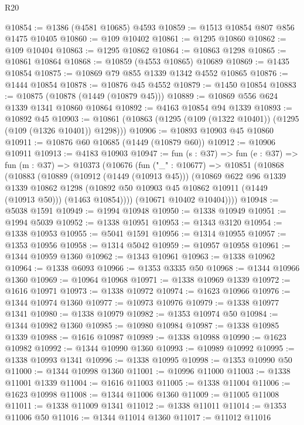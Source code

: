 \begin{lexlean}{R20}
\begin{coremodule}
@10854 := @1386 (@4581 @10685) @4593
@10859 := @1513 @10854 @807 @856 @1475 @10405
@10860 := @109 @10402
@10861 := @1295 @10860
@10862 := @109 @10404
@10863 := @1295 @10862
@10864 := @10863 @1298
@10865 := @10861 @10864
@10868 := @10859 (@4553 @10865) @10689
@10869 := @1435 @10854
@10875 := @10869 @79 @855 @1339 @1342 @4552 @10865
@10876 := @1444 @10854
@10878 := @10876 @45 @4552
@10879 := @1450 @10854
@10883 := @10875 (@10878 (@1449 (@10879 @45)))
@10889 := @10869 @556 @624 @1339 @1341 @10860 @10864
@10892 := @4163 @10854 @94 @1339
@10893 := @10892 @45
@10903 := @10861 (@10863 (@1295 (@109 (@1322 @10401)) (@1295 (@109 (@1326 @10401)) @1298)))
@10906 := @10893 @10903 @45 @10860
@10911 := @10876 @60 @10685 (@1449 (@10879 @60))
@10912 := @10906 @10911
@10913 := @4183 @10903
@10947 := fun (s : @37) =>
  fun (e : @37) =>
  fun (m : @37) =>
  @10373
    (@10676
      (fun ("_" : @10677) =>
      @10851
        (@10868
          (@10883
            (@10889
              (@10912 (@1449 (@10913 @45)))
              (@10869
                @622
                @96
                @1339
                @1339
                @10862
                @1298
                (@10892 @50 @10903 @45 @10862 @10911 (@1449 (@10913 @50)))
                (@1463 @10854))))
          (@10671 @10402 @10404))))
@10948 := @5038 @1591
@10949 := @1994 @10948
@10950 := @1338 @10949
@10951 := @1994 @5039
@10952 := @1338 @10951
@10953 := @1343 @3120
@10954 := @1338 @10953
@10955 := @5041 @1591
@10956 := @1314 @10955
@10957 := @1353 @10956
@10958 := @1314 @5042
@10959 := @10957 @10958
@10961 := @1344 @10959 @1360
@10962 := @1343 @10961
@10963 := @1338 @10962
@10964 := @1338 @6093
@10966 := @1353 @3335 @50
@10968 := @1344 @10966 @1360
@10969 := @10964 @10968
@10971 := @1338 @10969 @1339
@10972 := @1616 @10971
@10973 := @1338 @10972
@10974 := @1623 @10966
@10976 := @1344 @10974 @1360
@10977 := @10973 @10976
@10979 := @1338 @10977 @1341
@10980 := @1338 @10979
@10982 := @1353 @10974 @50
@10984 := @1344 @10982 @1360
@10985 := @10980 @10984
@10987 := @1338 @10985 @1339
@10988 := @1616 @10987
@10989 := @1338 @10988
@10990 := @1623 @10982
@10992 := @1344 @10990 @1360
@10993 := @10989 @10992
@10995 := @1338 @10993 @1341
@10996 := @1338 @10995
@10998 := @1353 @10990 @50
@11000 := @1344 @10998 @1360
@11001 := @10996 @11000
@11003 := @1338 @11001 @1339
@11004 := @1616 @11003
@11005 := @1338 @11004
@11006 := @1623 @10998
@11008 := @1344 @11006 @1360
@11009 := @11005 @11008
@11011 := @1338 @11009 @1341
@11012 := @1338 @11011
@11014 := @1353 @11006 @50
@11016 := @1344 @11014 @1360
@11017 := @11012 @11016

\end{coremodule}
\end{lexlean}
